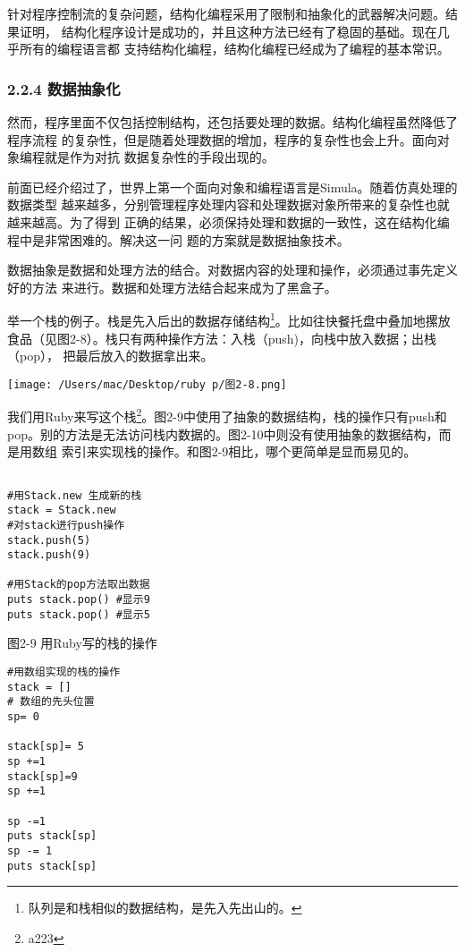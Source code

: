 \documentclass[11pt]{ctexart}
\begin{document}
针对程序控制流的复杂问题，结构化编程采用了限制和抽象化的武器解决问题。结果证明，
结构化程序设计是成功的，并且这种方法已经有了稳固的基础。现在几乎所有的编程语言都
支持结构化编程，结构化编程已经成为了编程的基本常识。
\subsubsection{2.2.4 数据抽象化}
\label{sec:orgc3ceb96}

然而，程序里面不仅包括控制结构，还包括要处理的数据。结构化编程虽然降低了程序流程
的复杂性，但是随着处理数据的增加，程序的复杂性也会上升。面向对象编程就是作为对抗
数据复杂性的手段出现的。

前面已经介绍过了，世界上第一个面向对象和编程语言是Simula。随着仿真处理的数据类型
越来越多，分别管理程序处理内容和处理数据对象所带来的复杂性也就越来越高。为了得到
正确的结果，必须保持处理和数据的一致性，这在结构化编程中是非常困难的。解决这一问
题的方案就是数据抽象技术。

数据抽象是数据和处理方法的结合。对数据内容的处理和操作，必须通过事先定义好的方法
来进行。数据和处理方法结合起来成为了黑盒子。

举一个栈的例子。栈是先入后出的数据存储结构\footnote{队列是和栈相似的数据结构，是先入先出山的。}。比如往快餐托盘中叠加地摞放
食品（见图2-8）。栈只有两种操作方法：入栈（push)，向栈中放入数据；出栈（pop），
把最后放入的数据拿出来。


\begin{center}
\texttt{[image: /Users/mac/Desktop/ruby p/图2-8.png]}
\end{center}

我们用Ruby来写这个栈\footnote{a223}。图2-9中使用了抽象的数据结构，栈的操作只有push和
pop。别的方法是无法访问栈内数据的。图2-10中则没有使用抽象的数据结构，而是用数组
索引来实现栈的操作。和图2-9相比，哪个更简单是显而易见的。

\lstset{language=org,label= ,caption= ,captionpos=b,numbers=none}
\begin{lstlisting}

#用Stack.new 生成新的栈
stack = Stack.new
#对stack进行push操作
stack.push(5)
stack.push(9)

#用Stack的pop方法取出数据
puts stack.pop() #显示9
puts stack.pop() #显示5
\end{lstlisting}

图2-9 用Ruby写的栈的操作
\lstset{language=org,label= ,caption= ,captionpos=b,numbers=none}
\begin{lstlisting}
#用数组实现的栈的操作
stack = []
# 数组的先头位置
sp= 0

stack[sp]= 5
sp +=1
stack[sp]=9 
sp +=1 

sp -=1
puts stack[sp]
sp -= 1 
puts stack[sp]
\end{lstlisting}
\end{document}
